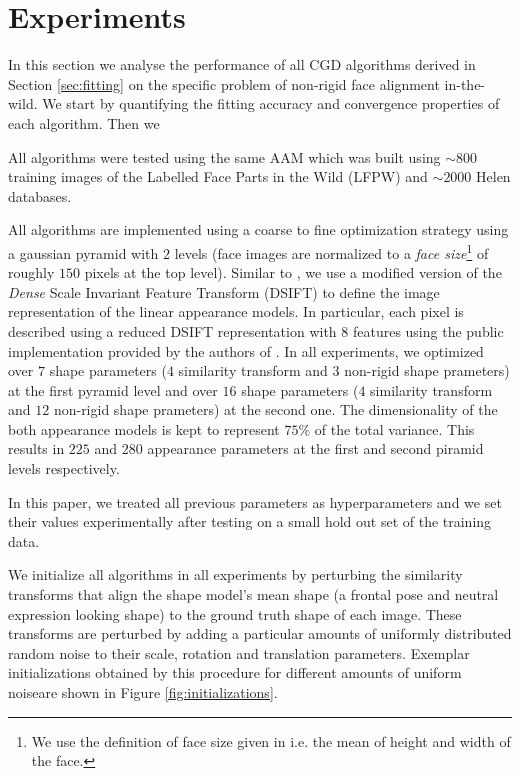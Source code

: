 \section{Experiments}
\label{sec:experiment}

In this section we analyse the performance of all CGD algorithms derived in Section \ref{sec:fitting} on the specific problem of non-rigid face alignment in-the-wild. We start by quantifying the fitting accuracy and convergence properties of each algorithm. Then we

All algorithms were tested using the same AAM which was built using $\sim800$  training images of the Labelled Face Parts in the Wild (LFPW) \cite{Belhumeur2011} and $\sim2000$ Helen \cite{Le2012} databases.

All algorithms are implemented using a coarse to fine optimization strategy using a gaussian pyramid with $2$ levels (face images are normalized to a \emph{face size}\footnote{We use the definition of face size given in \cite{Zhu2012} i.e. the mean of height and width of the face.} of roughly $150$ pixels at the top level). Similar to \cite{Tzimiropoulos2014}, we use a modified version of the \emph{Dense} Scale Invariant Feature Transform (DSIFT) \cite{Lowe1999, Dalal2005} to define the image representation of the linear appearance models. In particular, each pixel is described using a reduced DSIFT representation with $8$ features using the public implementation provided by the authors of \cite{Vedaldi2008vlfeat}. In all experiments, we optimized over $7$ shape parameters ($4$ similarity transform and $3$ non-rigid shape prameters) at the first pyramid level and over $16$ shape parameters ($4$ similarity transform and $12$ non-rigid shape prameters) at the second one. The dimensionality of the both appearance models is kept to represent $75\%$ of the total variance. This results in $225$ and $280$ appearance parameters at the first and second piramid levels respectively.

In this paper, we treated all previous parameters as hyperparameters and we set their values experimentally after testing on a small hold out set of the training data. 

We initialize all algorithms in all experiments by perturbing the similarity transforms that align the shape model's mean shape (a frontal pose and neutral expression looking shape) to the ground truth shape of  each image. These transforms are perturbed by adding a particular amounts of uniformly distributed random noise to their scale, rotation and translation parameters. Exemplar initializations obtained by this procedure for different amounts of uniform noiseare shown in Figure \ref{fig:initializations}.


